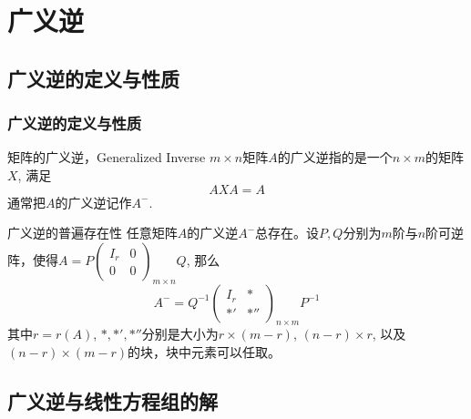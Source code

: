 
\section{广义逆}


\subsection{广义逆的定义与性质}


\begin{frame}
\frametitle{广义逆的定义与性质}

\begin{block}{矩阵的广义逆，Generalized Inverse}
$m\times n$矩阵$A$的广义逆指的是一个$n\times m$的矩阵$X$, 满足
\[AXA = A\]
通常把$A$的广义逆记作$A^-$.
\end{block}

\pause

\begin{block}{广义逆的普遍存在性}
任意矩阵$A$的广义逆$A^-$总存在。设$P,Q$分别为$m$阶与$n$阶可逆阵，使得$A = P \begin{pmatrix} I_r & 0 \\ 0 & 0 \end{pmatrix}_{m\times n}\!\!\!\!\!\!\!\!\!\!\! Q$, 那么
\[A^- = Q^{-1} \begin{pmatrix} I_r & * \\ *' & *'' \end{pmatrix}_{n\times m}\!\!\!\!\!\!\!\!\!\!\! P^{-1}\]
其中$r = r(A)$, $*,*',*''$分别是大小为$r \times (m-r)$, $(n-r) \times r$, 以及$(n-r) \times (m-r)$的块，块中元素可以任取。
\end{block}

\end{frame}


\subsection{广义逆与线性方程组的解}


